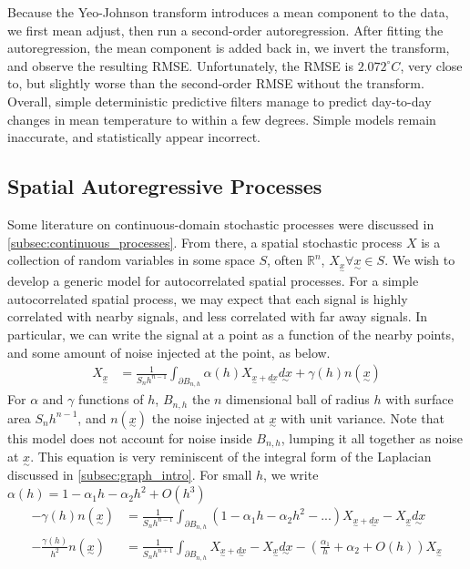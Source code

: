 \documentclass[12pt,a4paper]{article} %
\newcommand{\ve}[1]{\underset{\sim}{#1}}
\begin{document}
Because the Yeo-Johnson transform introduces a mean component to the data, we first mean adjust, then run a second-order autoregression. After fitting the autoregression, the mean component is added back in, we invert the transform, and observe the resulting RMSE. Unfortunately, the RMSE is $2.072^\circ C$, very close to, but slightly worse than the second-order RMSE without the transform.\\

Overall, simple deterministic predictive filters manage to predict day-to-day changes in mean temperature to within a few degrees. Simple models remain inaccurate, and statistically appear incorrect.

\subsection{Spatial Autoregressive Processes}
\label{subsec:spatial_autoreg}
Some literature on continuous-domain stochastic processes were discussed in \ref{subsec:continuous_processes}. From there, a spatial stochastic process $X$ is a collection of random variables in some space $S$, often $\mathbb{R}^n$, $X_{\ve{x}}\forall\ve{x}\in S$. We wish to develop a generic model for autocorrelated spatial processes. For a simple autocorrelated spatial process, we may expect that each signal is highly correlated with nearby signals, and less correlated with far away signals. In particular, we can write the signal at a point as a function of the nearby points, and some amount of noise injected at the point, as below.
\begin{align*}
    X_{\ve{x}}&=\frac{1}{S_nh^{n-1}}\int_{\partial B_{n,h}}\alpha(h)X_{\ve{x}+\ve{dx}}\ve{dx}+\gamma(h) n(\ve{x})
\end{align*}
For $\alpha$ and $\gamma$ functions of $h$, $B_{n,h}$ the $n$ dimensional ball of radius $h$ with surface area $S_nh^{n-1}$, and $n(\ve{x})$ the noise injected at $\ve{x}$ with unit variance. Note that this model does not account for noise inside $B_{n,h}$, lumping it all together as noise at $\ve{x}$. This equation is very reminiscent of the integral form of the Laplacian discussed in \ref{subsec:graph_intro}. For small $h$, we write $\alpha(h)=1-\alpha_1 h-\alpha_2h^2+O(h^3)$
\begin{align*}
    -\gamma(h)n(\ve{x})&=\frac{1}{S_nh^{n-1}}\int_{\partial B_{n,h}}(1-\alpha_1 h-\alpha_2h^2-...)X_{\ve{x}+\ve{dx}}-X_{\ve{x}}\ve{dx}\\
    -\frac{\gamma(h)}{h^2}n(\ve{x})&=\frac{1}{S_nh^{n+1}}\int_{\partial B_{n,h}}X_{\ve{x}+\ve{dx}}-X_{\ve{x}}\ve{dx}-(\frac{\alpha_1}{h}+\alpha_2+O(h))X_{\ve{x}}\\
\end{align*}
\end{document}
